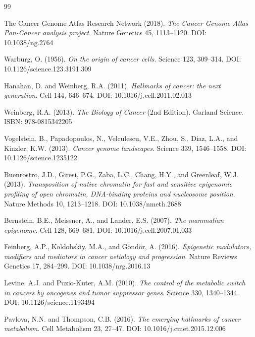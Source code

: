 \documentclass[11pt,letterpaper]{article}
\begin{document}

\begin{thebibliography}{99}

The Cancer Genome Atlas Research Network (2018).
\textit{The Cancer Genome Atlas Pan-Cancer analysis project}.
Nature Genetics 45, 1113--1120. DOI: 10.1038/ng.2764

Warburg, O. (1956).
\textit{On the origin of cancer cells}.
Science 123, 309--314. DOI: 10.1126/science.123.3191.309

Hanahan, D. and Weinberg, R.A. (2011).
\textit{Hallmarks of cancer: the next generation}.
Cell 144, 646--674. DOI: 10.1016/j.cell.2011.02.013

Weinberg, R.A. (2013).
\textit{The Biology of Cancer} (2nd Edition).
Garland Science. ISBN: 978-0815342205

Vogelstein, B., Papadopoulos, N., Velculescu, V.E., Zhou, S., Diaz, L.A., and Kinzler, K.W. (2013).
\textit{Cancer genome landscapes}.
Science 339, 1546--1558. DOI: 10.1126/science.1235122

Buenrostro, J.D., Giresi, P.G., Zaba, L.C., Chang, H.Y., and Greenleaf, W.J. (2013).
\textit{Transposition of native chromatin for fast and sensitive epigenomic profiling of open chromatin, DNA-binding proteins and nucleosome position}.
Nature Methods 10, 1213--1218. DOI: 10.1038/nmeth.2688

Bernstein, B.E., Meissner, A., and Lander, E.S. (2007).
\textit{The mammalian epigenome}.
Cell 128, 669--681. DOI: 10.1016/j.cell.2007.01.033

Feinberg, A.P., Koldobskiy, M.A., and Göndör, A. (2016).
\textit{Epigenetic modulators, modifiers and mediators in cancer aetiology and progression}.
Nature Reviews Genetics 17, 284--299. DOI: 10.1038/nrg.2016.13

Levine, A.J. and Puzio-Kuter, A.M. (2010).
\textit{The control of the metabolic switch in cancers by oncogenes and tumor suppressor genes}.
Science 330, 1340--1344. DOI: 10.1126/science.1193494

Pavlova, N.N. and Thompson, C.B. (2016).
\textit{The emerging hallmarks of cancer metabolism}.
Cell Metabolism 23, 27--47. DOI: 10.1016/j.cmet.2015.12.006


\end{thebibliography}
\end{document}
